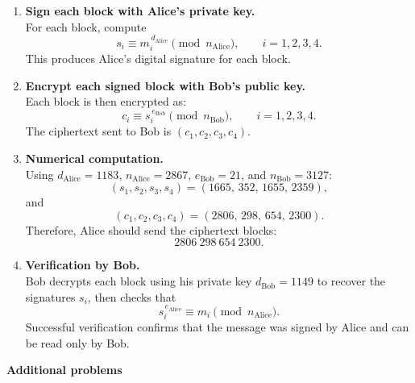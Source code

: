 \documentclass{article}
\begin{document}
\begin{itemize}
\begin{enumerate}
    \item \textbf{Sign each block with Alice’s private key.} \\
    For each block, compute
    \[
        s_i \equiv m_i^{\,d_{\text{Alice}}} \pmod{n_{\text{Alice}}}, \qquad i = 1, 2, 3, 4.
    \]
    This produces Alice’s digital signature for each block.

    \item \textbf{Encrypt each signed block with Bob’s public key.} \\
    Each block is then encrypted as:
    \[
        c_i \equiv s_i^{\,e_{\text{Bob}}} \pmod{n_{\text{Bob}}}, \qquad i = 1, 2, 3, 4.
    \]
    The ciphertext sent to Bob is \((c_1, c_2, c_3, c_4)\).

    \item \textbf{Numerical computation.} \\
    Using \(d_{\text{Alice}} = 1183\), \(n_{\text{Alice}} = 2867\), \(e_{\text{Bob}} = 21\), and \(n_{\text{Bob}} = 3127\):
    \[
        (s_1, s_2, s_3, s_4) = (1665,\, 352,\, 1655,\, 2359),
    \]
    and
    \[
        (c_1, c_2, c_3, c_4) = (2806,\, 298,\, 654,\, 2300).
    \]
    Therefore, Alice should send the ciphertext blocks:
    \[
        \boxed{2806\ 298\ 654\ 2300.}
    \]

    \item \textbf{Verification by Bob.} \\
    Bob decrypts each block using his private key \(d_{\text{Bob}} = 1149\) to recover the signatures \(s_i\), then checks that
    \[
        s_i^{\,e_{\text{Alice}}} \equiv m_i \pmod{n_{\text{Alice}}}.
    \]
    Successful verification confirms that the message was signed by Alice and can be read only by Bob.
\end{enumerate}
\end{itemize}

\newpage
\noindent \textbf{Additional problems}
\end{document}
